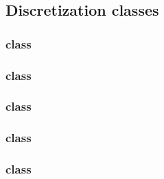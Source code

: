 \documentclass[10pt]{article}
\begin{document}
\subsection{Discretization classes}

\subsubsection{ class} \label{sss:class-discret}

\begin{center}
\end{center}

\subsubsection{ class}  \label{sss:class-hypre}

\begin{center}
\end{center}

\subsubsection{ class} \label{sss:class-mpi}

\begin{center}
\end{center}

\subsubsection{ class} \label{sss:class-point}

\begin{center}
\end{center}

\subsubsection{ class} \label{sss:class-field}
\end{document}
